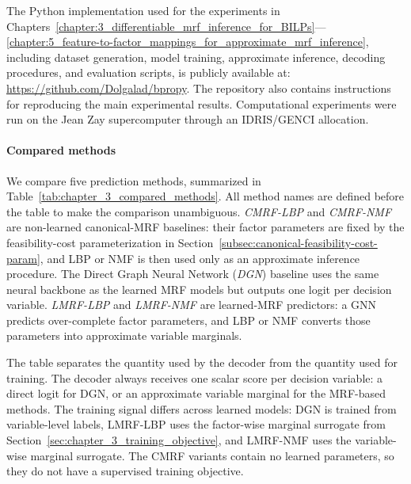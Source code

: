 The Python implementation used for the experiments in Chapters~\ref{chapter:3_differentiable_mrf_inference_for_BILPs}---\ref{chapter:5_feature-to-factor_mappings_for_approximate_mrf_inference}, including dataset generation, model training, approximate inference, decoding procedures, and evaluation scripts, is publicly available at: \url{https://github.com/Dolgalad/bpropy}. The repository also contains instructions for reproducing the main experimental results. Computational experiments were run on the Jean Zay supercomputer through an IDRIS/GENCI allocation.

\paragraph{Compared methods}
We compare five prediction methods, summarized in Table~\ref{tab:chapter_3_compared_methods}. All method names are defined before the table to make the comparison unambiguous. \emph{CMRF-LBP} and \emph{CMRF-NMF} are non-learned canonical-MRF baselines: their factor parameters are fixed by the feasibility-cost parameterization in Section~\ref{subsec:canonical-feasibility-cost-param}, and LBP or NMF is then used only as an approximate inference procedure. The Direct Graph Neural Network (\emph{DGN}) baseline uses the same neural backbone as the learned MRF models but outputs one logit per decision variable. \emph{LMRF-LBP} and \emph{LMRF-NMF} are learned-MRF predictors: a GNN predicts over-complete factor parameters, and LBP or NMF converts those parameters into approximate variable marginals.

The table separates the quantity used by the decoder from the quantity used for training. The decoder always receives one scalar score per decision variable: a direct logit for DGN, or an approximate variable marginal for the MRF-based methods. The training signal differs across learned models: DGN is trained from variable-level labels, LMRF-LBP uses the factor-wise marginal surrogate from Section~\ref{sec:chapter_3_training_objective}, and LMRF-NMF uses the variable-wise marginal surrogate. The CMRF variants contain no learned parameters, so they do not have a supervised training objective.

